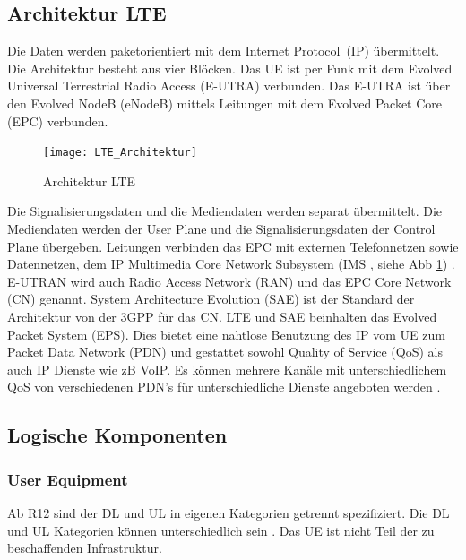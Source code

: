 \subsection{Architektur LTE}
\label{subsec:architektur}
Die Daten werden paketorientiert mit dem Internet Protocol~(IP) übermittelt. Die Architektur besteht aus vier Blöcken. Das UE ist per Funk mit dem Evolved Universal Terrestrial Radio Access (E-UTRA) verbunden. Das E-UTRA ist über den Evolved NodeB (eNodeB) mittels Leitungen mit dem Evolved Packet Core (EPC) verbunden.
\begin{figure}[H]
	\centering
	\texttt{[image: LTE\_Architektur]}
	\caption{Architektur LTE \protect\cite{Fir19}}
	\label{fig:bildarchitektur}
\end{figure}
Die Signalisierungsdaten und die Mediendaten werden separat übermittelt. Die Mediendaten werden der User Plane und die Signalisierungsdaten der Control Plane übergeben. Leitungen verbinden das EPC mit externen Telefonnetzen sowie Datennetzen, dem IP Multimedia Core Network Subsystem (IMS , siehe Abb \ref{fig:bildarchitektur}) \cite{Fir19}.
E-UTRAN wird auch Radio Access Network (RAN) und das EPC Core Network (CN) genannt. System Architecture Evolution (SAE) ist der Standard der Architektur von der 3GPP für das CN. LTE und SAE beinhalten das Evolved Packet System (EPS). Dies bietet eine nahtlose Benutzung des IP vom UE zum Packet Data Network (PDN) und gestattet sowohl Quality of Service (QoS) als auch IP Dienste wie zB VoIP. Es können mehrere Kanäle mit unterschiedlichem QoS von verschiedenen PDN's für unterschiedliche Dienste angeboten werden \cite{Ses11}.
\subsection{Logische Komponenten}
\label{subsec:logkomponenten}
\subsubsection{User Equipment}
\label{subsubsec:ue}
Ab R12 sind der DL und UL in eigenen Kategorien getrennt spezifiziert. Die DL und UL Kategorien können unterschiedlich sein \cite{GPP19}. Das UE ist nicht Teil der zu beschaffenden Infrastruktur. 
